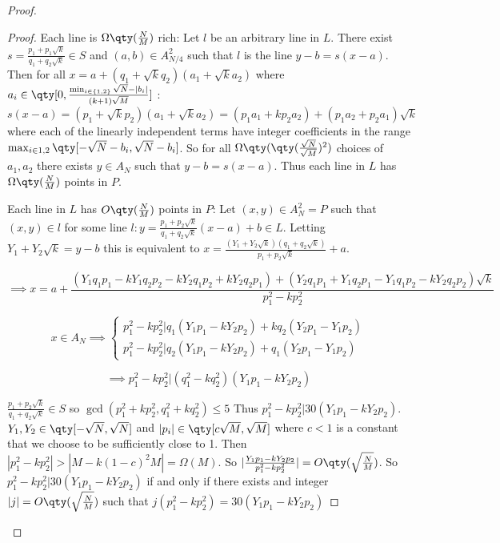 \documentclass[11pt]{article}
\begin{document}
\begin{proof}
\begin{proof}
Each line is $\Omega\qty(\frac{N}{M})$ rich: Let $l$ be an arbitrary line in $L$. There exist $s=\frac{p_1+p_1\sqrt{k}}{q_1+q_2\sqrt{k}} \in S$ and $(a,b) \in A_{N/4}^2$ such that $l$ is the line $y-b = s(x-a)$. Then for all $x = a + (q_1+\sqrt{k}q_2)(a_1+\sqrt{k}a_2)$ where $a_i \in \qty[0,\frac{\min_{i\in \{1,2 \}} \sqrt{N}-|b_i|}{(k+1)\sqrt{M}}]$ : $s(x-a)=(p_1+\sqrt{k}p_2)(a_1+\sqrt{k}a_2) = (p_1a_1+kp_2a_2) + (p_1a_2 + p_2a_1)\sqrt{k}$ where each of the linearly independent terms have integer coefficients in the range $\max_{i \in {1,2}} \qty[ -\sqrt{N} - b_i,\sqrt{N}-b_i]$. So  for all $\Omega\qty(\qty(\frac{\sqrt{N}}{\sqrt{M}})^2)$ choices of $a_1 ,a_2$ there exists $y \in A_N$ such that $y-b = s(x-a)$. Thus each line in $L$ has $\Omega\qty(\frac{N}{M})$ points in $P$.

Each line in $L$ has $O\qty(\frac{N}{M})$ points in $P$:
Let $(x,y) \in  A_N^2 = P$ such that $(x,y) \in l$ for some line $l : y = \frac{p_1+p_2\sqrt{k}}{q_1+q_2\sqrt{k}}(x-a) + b \in L$. Letting $Y_1 + Y_2\sqrt{k}= y - b$ this is equivalent to $x = \frac{(Y_1+Y_2\sqrt{k})(q_1+q_2\sqrt{k})}{p_1+p_2\sqrt{k}} + a$.

\begin{equation*}
    \implies x = a + \frac{(Y_1q_1p_1-kY_1q_2p_2-kY_2q_1p_2+kY_2q_2p_1)+(Y_2q_1p_1+Y_1q_2p_1-Y_1q_1p_2-kY_2q_2p_2)\sqrt{k}}{p_1^2-kp_2^2}
\end{equation*}

\begin{equation*}
    x \in A_N \implies \begin{cases}
    p_1^2 - kp_2^2 |q_1(Y_1p_1-kY_2p_2)+kq_2(Y_2p_1-Y_1p_2)\\
    p_1^2 - kp_2^2 |q_2(Y_1p_1-kY_2p_2)+q_1(Y_2p_1-Y_1p_2)
    \end{cases}
\end{equation*}

\begin{equation*}
    \implies
    p_1^2 - kp_2^2 | (q_1^2-kq_2^2)(Y_1p_1-kY_2p_2)
\end{equation*}

$\frac{p_1+p_2\sqrt{k}}{q_1+q_2\sqrt{k}} \in S$ so $\gcd(p_1^2+k p_2^2,q_1^2+kq_2^2) \leq 5$ Thus $p_1^2-kp_2^2 | 30(Y_1p_1-kY_2p_2)$. $Y_1,Y_2 \in \qty[-\sqrt{N},\sqrt{N}]$ and $|p_i| \in \qty[c\sqrt{M},\sqrt{M}]$ where $c<1$ is a constant that we choose to be sufficiently close to 1. Then $|p_1^2-kp_2^2|>|M-k(1-c)^2 M| = \Omega(M)$. So $ |\frac{Y_1p_1-kY_2p_2}{p_1^2-kp_2^2}| =O \qty( \sqrt{\frac{N}{M}})$. So $p_1^2 - kp_2^2 | 30(Y_1p_1-kY_2p_2)$ if and only if there exists and integer $|j|=O\qty(\sqrt{\frac{N}{M}})$ such that $j(p_1^2-kp_2^2)=30(Y_1p_1-kY_2p_2)$


\end{proof}
\end{proof}
\end{document}
